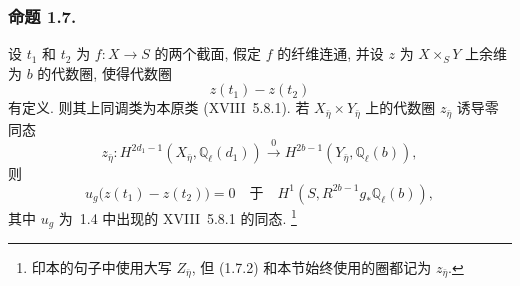 \subsubsection*{命题 1.7.}
设 $t_1$ 和 $t_2$ 为 $f:X\longrightarrow S$ 的两个截面, 假定 $f$ 的纤维连通, 并设 $z$ 为 $X\times_S Y$ 上余维为 $b$ 的代数圈, 使得代数圈
\begin{equation}\tag{1.7.1}
z(t_1)-z(t_2)
\end{equation}
有定义. 则其上同调类为本原类 (XVIII~5.8.1). 若 $X_{\bar\eta}\times Y_{\bar\eta}$ 上的代数圈 $z_{\bar\eta}$ 诱导零同态
\begin{equation}\tag{1.7.2}
z_{\bar\eta}:H^{2d_1-1}(X_{\bar\eta},\mathbb Q_\ell(d_1))
\stackrel{0}{\longrightarrow}
H^{2b-1}(Y_{\bar\eta},\mathbb Q_\ell(b)),
\end{equation}
则
\begin{equation}\tag{1.7.3}
u_g\bigl(z(t_1)-z(t_2)\bigr)=0\quad\text{于}\quad
H^1(S,R^{2b-1}g_*\mathbb Q_\ell(b)),
\end{equation}
其中 $u_g$ 为~1.4 中出现的 XVIII~5.8.1 的同态.
\footnote{印本的句子中使用大写 $Z_{\bar\eta}$, 但 (1.7.2) 和本节始终使用的圈都记为 $z_{\bar\eta}$.}

